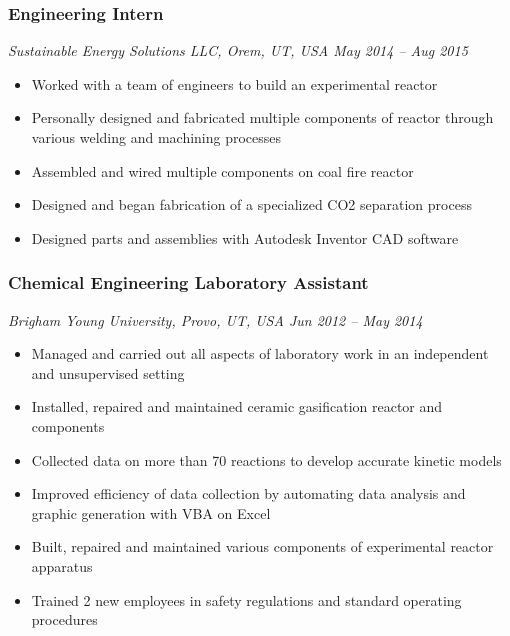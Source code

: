 \hypertarget{engineering-intern}{%
\subsubsection{Engineering Intern}\label{engineering-intern}}

\emph{Sustainable Energy Solutions LLC, Orem, UT, USA \textbar{} May
2014 -- Aug 2015}

\begin{itemize}
\tightlist
\item
  Worked with a team of engineers to build an experimental reactor
\item
  Personally designed and fabricated multiple components of reactor
  through various welding and machining processes
\item
  Assembled and wired multiple components on coal fire reactor
\item
  Designed and began fabrication of a specialized CO2 separation process
\item
  Designed parts and assemblies with Autodesk Inventor CAD software
\end{itemize}

\hypertarget{chemical-engineering-laboratory-assistant}{%
\subsubsection{Chemical Engineering Laboratory
Assistant}\label{chemical-engineering-laboratory-assistant}}

\emph{Brigham Young University, Provo, UT, USA \textbar{} Jun 2012 --
May 2014}

\begin{itemize}
\tightlist
\item
  Managed and carried out all aspects of laboratory work in an
  independent and unsupervised setting
\item
  Installed, repaired and maintained ceramic gasification reactor and
  components
\item
  Collected data on more than 70 reactions to develop accurate kinetic
  models
\item
  Improved efficiency of data collection by automating data analysis and
  graphic generation with VBA on Excel
\item
  Built, repaired and maintained various components of experimental
  reactor apparatus
\item
  Trained 2 new employees in safety regulations and standard operating
  procedures
\end{itemize}

